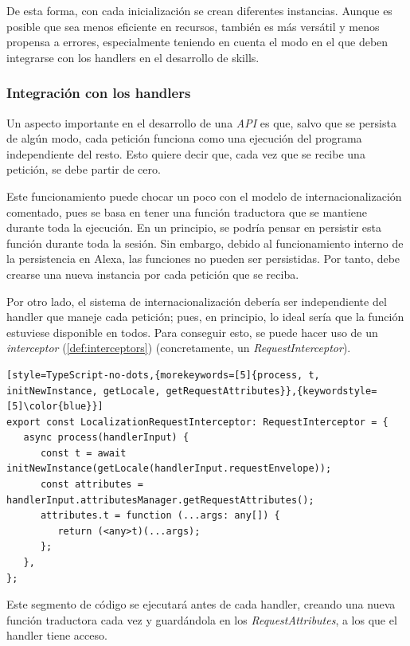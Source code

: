 \documentclass[11pt,spanish,listoffigures,listoftables,table,hyphens,dvipsnames]{tfgetsinf}
\begin{document}
De esta forma, con cada inicialización se crean diferentes instancias. Aunque es posible que sea menos eficiente en recursos, también es más versátil y menos propensa a errores, especialmente teniendo en cuenta el modo en el que deben integrarse con los handlers en el desarrollo de skills.

\subsubsection{Integración con los handlers}

Un aspecto importante en el desarrollo de una \emph{API} es que, salvo que se persista de algún modo, cada petición funciona como una ejecución del programa independiente del resto. Esto quiere decir que, cada vez que se recibe una petición, se debe partir de cero.

Este funcionamiento puede chocar un poco con el modelo de internacionalización comentado, pues se basa en tener una función traductora que se mantiene durante toda la ejecución. En un principio, se podría pensar en persistir esta función durante toda la sesión. Sin embargo, debido al funcionamiento interno de la persistencia en Alexa, las funciones no pueden ser persistidas. Por tanto, debe crearse una nueva instancia por cada petición que se reciba.

Por otro lado, el sistema de internacionalización debería ser independiente del handler que maneje cada petición; pues, en principio, lo ideal sería que la función estuviese disponible en todos. Para conseguir esto, se puede hacer uso de un \emph{interceptor} (\ref{def:interceptors}) (concretamente, un \emph{RequestInterceptor}).

\begin{lstlisting}[style=TypeScript-no-dots,{morekeywords=[5]{process, t, initNewInstance, getLocale, getRequestAttributes}},{keywordstyle=[5]\color{blue}}]
export const LocalizationRequestInterceptor: RequestInterceptor = {
   async process(handlerInput) {
      const t = await initNewInstance(getLocale(handlerInput.requestEnvelope));
      const attributes = handlerInput.attributesManager.getRequestAttributes();
      attributes.t = function (...args: any[]) {
         return (<any>t)(...args);
      };
   },
};
\end{lstlisting}

Este segmento de código se ejecutará antes de cada handler, creando una nueva función traductora cada vez y guardándola en los \emph{RequestAttributes}, a los que el handler tiene acceso.
\end{document}
